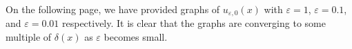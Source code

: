 \documentclass[12pt,reqno]{amsart}
\numberwithin{equation}{section}  %
\newcommand{\ee}{\varepsilon}
\begin{document}
          On the following page, we have provided graphs of
          $u_{\ee,0}(x)$ with $\ee = 1$, $\ee = 0.1$, and $\ee = 0.01$
          respectively. It is clear that the graphs are converging to some
          multiple of $\delta(x)$ as $\ee$ becomes small.
          \newpage
\begin{figure}[!ht]
  \begin{center}
  \vspace{-30mm}
\hspace{-20mm}
\\
\vspace{-50mm}
\end{center}
\end{figure}
%
%
\vspace{-30mm}
%
\end{document}
